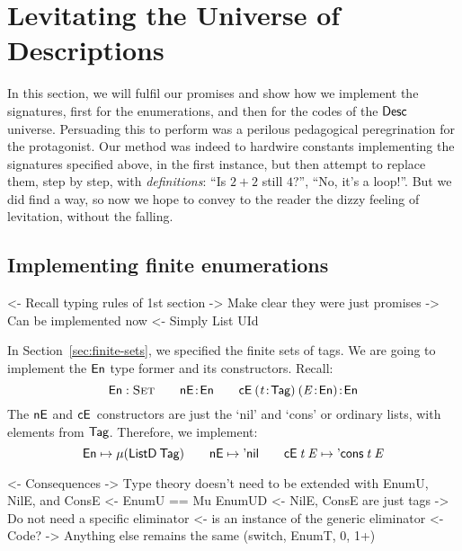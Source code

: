 \section{Levitating the Universe of Descriptions}
\label{sec:desc-levitate}

In this section, we will fulfil our promises and show how we implement
the signatures, first for the enumerations, and then for the codes of
the $\Desc$ universe.  Persuading this to perform was a perilous
pedagogical peregrination for the protagonist.  Our method was indeed to
hardwire constants implementing the signatures specified above, in the
first instance, but then attempt to replace them, step by step, with
\emph{definitions}: ``Is \(2+2\) still \(4\)?'', ``No, it's a loop!''.
But we did find a way, so now we hope to convey to the reader the
dizzy feeling of levitation, without the falling.



\subsection{Implementing finite enumerations}

\begin{wstructure}
<- Recall typing rules of 1st section
    -> Make clear they were just promises
    -> Can be implemented now
        <- Simply List UId
\end{wstructure}

In Section~\ref{sec:finite-sets}, we specified the
finite sets of tags. We are going to implement the $\EnumU$ type former and
its constructors. Recall:
%
\[\Type{\EnumU}\qquad\Bhab{\NilE}{\EnumU}\qquad
\Bhab{\ConsE{(\Bhab{\M{t}}{\UId})}{(\Bhab{\M{E}}{\EnumU})}}{\EnumU}
\]
%
The $\NilE$ and $\ConsE{\!}{\!}$ constructors are just the `nil' and
`cons' or ordinary lists, with elements from \(\UId\).
Therefore, we
implement:
%
\[
\EnumU \mapsto \Mu{(\ListD\: \UId)}
\qquad
\NilE \mapsto \ListNil
\qquad
\ConsE{\M{t}}{\M{E}} \mapsto \ListCons{\M{t}}{\M{E}}
\]


\begin{wstructure}
<- Consequences
    -> Type theory doesn't need to be extended with EnumU, NilE, and ConsE
        <- EnumU == Mu EnumUD
        <- NilE, ConsE are just tags
    -> Do not need a specific \spi eliminator
        <- \spi is an instance of the generic eliminator
            <- Code?
    -> Anything else remains the same (switch, EnumT, 0, 1+)
\end{wstructure}

